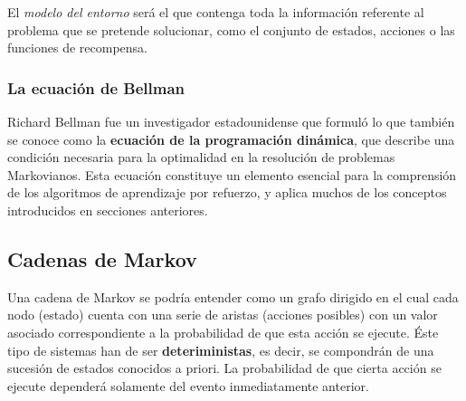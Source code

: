 \documentclass[11pt,spanish,listoffigures,listoftables]{tfgetsinf}
\begin{document}
El \textit{modelo del entorno} será el que contenga toda la información referente al problema que se pretende solucionar, como el conjunto de estados, acciones o las funciones de recompensa.




\subsubsection{La ecuación de Bellman}

Richard Bellman fue un investigador estadounidense que formuló lo que también se conoce como la \textbf{ecuación de la programación dinámica}, que describe una condición necesaria para la optimalidad en la resolución de problemas Markovianos. Esta ecuación constituye un elemento esencial para la comprensión de los algoritmos de aprendizaje por refuerzo, y aplica muchos de los conceptos introducidos en secciones anteriores.



\subsection{Cadenas de Markov}

Una cadena de Markov se podría entender como un grafo dirigido en el cual cada nodo (estado) cuenta con una serie de aristas (acciones posibles) con un valor asociado correspondiente a la probabilidad de que esta acción se ejecute. Éste tipo de sistemas han de ser \textbf{deteriministas}, es decir, se compondrán de una sucesión de estados conocidos a priori. La probabilidad de que cierta acción se ejecute dependerá solamente del evento inmediatamente anterior.
\end{document}
